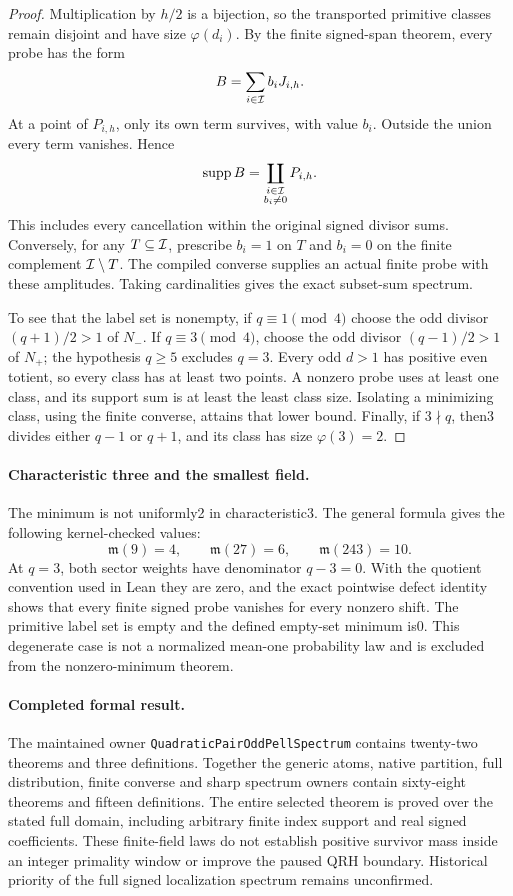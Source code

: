 \documentclass[11pt]{article}
\begin{document}
\begin{proof}
Multiplication by \(h/2\) is a bijection, so the transported
primitive classes remain disjoint and have size \(\varphi(d_i)\).
By the finite signed-span theorem, every probe has the form
\[
                         B=\sum_{i\in{\cal I}}b_iJ_{i,h}.
\]
At a point of \(P_{i,h}\), only its own term survives, with value
\(b_i\). Outside the union every term vanishes. Hence
\[
 \operatorname{supp} B=
    \coprod_{\substack{i\in{\cal I}\\b_i\ne0}}P_{i,h}.
\]
This includes every cancellation within the original signed
divisor sums. Conversely, for any \(T\subseteq{\cal I}\), prescribe
\(b_i=1\) on \(T\) and \(b_i=0\) on the finite complement
\({\cal I}\setminus T\). The compiled converse supplies an actual
finite probe with these amplitudes. Taking cardinalities gives
the exact subset-sum spectrum.

To see that the label set is nonempty, if \(q\equiv1\pmod4\)
choose the odd divisor \((q+1)/2>1\) of \(N_-\).
If \(q\equiv3\pmod4\), choose the odd divisor \((q-1)/2>1\)
of \(N_+\); the hypothesis \(q\ge5\) excludes \(q=3\).
Every odd \(d>1\) has positive even totient, so every class
has at least two points. A nonzero probe uses at least one class,
and its support sum is at least the least class size.
Isolating a minimizing class, using the finite converse, attains
that lower bound. Finally, if \(3\nmid q\), then3 divides either
\(q-1\) or \(q+1\), and its class has size \(\varphi(3)=2\).
\end{proof}

\paragraph{Characteristic three and the smallest field.}
The minimum is not uniformly2 in characteristic3. The general
formula gives the following kernel-checked values:
\[
            \mathfrak m(9)=4,\qquad
            \mathfrak m(27)=6,\qquad
            \mathfrak m(243)=10.
\]
At \(q=3\), both sector weights have denominator \(q-3=0\).
With the quotient convention used in Lean they are zero, and
the exact pointwise defect identity shows that every finite
signed probe vanishes for every nonzero shift.
The primitive label set is empty and the defined empty-set
minimum is0. This degenerate case is not a normalized mean-one
probability law and is excluded from the nonzero-minimum theorem.

\paragraph{Completed formal result.}
The maintained owner \texttt{QuadraticPairOddPellSpectrum}
contains twenty-two theorems and three definitions.
Together the generic atoms, native partition, full distribution,
finite converse and sharp spectrum owners contain sixty-eight
theorems and fifteen definitions. The entire selected theorem is
proved over the stated full domain, including arbitrary finite
index support and real signed coefficients.
These finite-field laws do not establish positive survivor mass
inside an integer primality window or improve the paused QRH
boundary. Historical priority of the full signed localization
spectrum remains unconfirmed.
\end{document}
